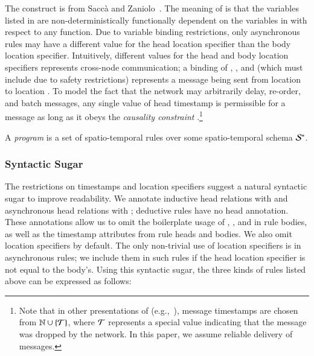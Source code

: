 The  construct is from Sacc\`{a} and Zaniolo~\cite{sacca-zaniolo}.
The meaning of  is that the variables listed
in  are non-deterministically functionally dependent on the variables in  with respect to
any function.  Due to variable binding restrictions, only asynchronous rules may
have a different value for the head location specifier than the body location
specifier.  Intuitively, different values for the head and body location specifiers represents
cross-node communication; a binding of , , and 
(which must include  due to safety restrictions) represents a message
being sent from location  to location .  To model the fact
that the network may arbitrarily delay, re-order, and batch messages, any single
value of head timestamp  is permissible for a message as long as it
obeys the {\em causality constraint} .\footnote{Note that in
  other presentations of \lang (e.g.,~\cite{dedalus}), message timestamps are
  chosen from $\mathbb{N} \cup \{\mathcal{T}\}$, where $\mathcal{T}$ represents a special value
  indicating that the message was dropped by the network. In this paper, we
  assume reliable delivery of messages.}

A \lang \emph{program} is a set of spatio-temporal rules over some
spatio-temporal schema $\mathcal{S}^*$.  

\subsubsection{Syntactic Sugar}
The restrictions on timestamps and location specifiers suggest a natural
syntactic sugar to improve readability.  We annotate inductive head relations
with  and asynchronous head relations with ;
deductive rules have no head annotation.  These annotations allow us to omit the
boilerplate usage of , ,  and
 in rule bodies, as well as the timestamp attributes from rule
heads and bodies.  We also omit location specifiers by default. The only
non-trivial use of location specifiers is in asynchronous rules; we include them
in such rules if the head location specifier is not equal to the body's. Using
this syntactic sugar, the three kinds of rules listed above can be expressed as
follows:

